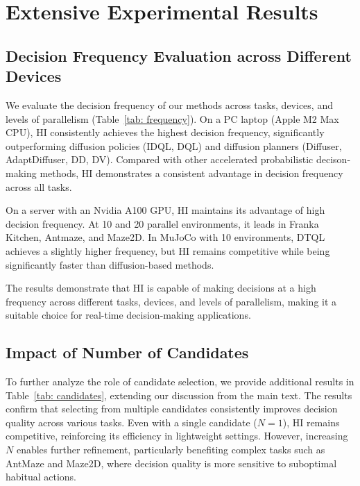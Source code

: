 \section{Extensive Experimental Results}

\subsection{Decision Frequency Evaluation across Different Devices}

\label{sec:device-eval}
We evaluate the decision frequency of our methods across tasks, devices, and levels of parallelism (Table~\ref{tab: frequency}). On a PC laptop (Apple M2 Max CPU), HI consistently achieves the highest decision frequency, significantly outperforming diffusion policies (IDQL, DQL) and diffusion planners (Diffuser, AdaptDiffuser, DD, DV). Compared with other accelerated probabilistic decison-making methods, HI demonstrates a consistent advantage in decision frequency across all tasks. 

On a server with an Nvidia A100 GPU, HI maintains its advantage of high decision frequency. At 10 and 20 parallel environments, it leads in Franka Kitchen, Antmaze, and Maze2D. In MuJoCo with 10 environments, DTQL achieves a slightly higher frequency, but HI remains competitive while being significantly faster than diffusion-based methods.

The results demonstrate that HI is capable of making decisions at a high frequency across different tasks, devices, and levels of parallelism, making it a suitable choice for real-time decision-making applications.



\subsection{Impact of Number of Candidates}

To further analyze the role of candidate selection, we provide additional results in Table~\ref{tab: candidates}, extending our discussion from the main text. The results confirm that selecting from multiple candidates consistently improves decision quality across various tasks. Even with a single candidate ($N=1$), HI remains competitive, reinforcing its efficiency in lightweight settings. However, increasing $N$ enables further refinement, particularly benefiting complex tasks such as AntMaze and Maze2D, where decision quality is more sensitive to suboptimal habitual actions.

